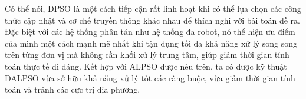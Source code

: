 Có thể nói, DPSO là một cách tiếp cận rất linh hoạt khi có thể lựa chọn các công thức cập nhật và cơ chế truyền thông khác nhau để thích nghi với bài toán đề ra. Đặc biệt với các hệ thống phân tán như hệ thống đa robot, nó thể hiện ưu điểm của mình một cách mạnh mẽ nhất khi tận dụng tối đa khả năng xử lý song song trên từng đơn vị mà không cần khối xử lý trung tâm, giúp giảm thời gian tính toán thực tế đi đáng. Kết hợp với ALPSO được nêu trên, ta có được kỹ thuật DALPSO vừa sở hữu khả năng xử lý tốt các ràng buộc, vừa giảm thời gian tính toán và tránh các cực trị địa phương. 
